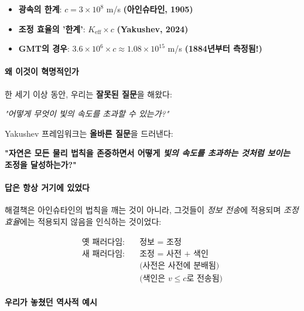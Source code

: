 \documentclass[11pt,a4paper]{article}
\begin{document}
\begin{itemize}
\item \textbf{광속의 한계}: $c = 3 \times 10^8$ m/s \textbf{(아인슈타인, 1905)}
\item \textbf{조정 효율의 '한계'}: $K_{\mathrm{eff}} \times c$ \textbf{(Yakushev, 2024)}
\item \textbf{GMT의 경우}: $3.6 \times 10^6 \times c \approx 1.08 \times 10^{15}$ m/s \textbf{(1884년부터 측정됨!)}
\end{itemize}

\paragraph{왜 이것이 혁명적인가}
한 세기 이상 동안, 우리는 \textbf{잘못된 질문}을 해왔다:
\begin{center}
\itshape "어떻게 무엇이 빛의 속도를 초과할 수 있는가?" 
\end{center}

Yakushev 프레임워크는 \textbf{올바른 질문}을 드러낸다:
\begin{center}
\bfseries "자연은 모든 물리 법칙을 존중하면서 어떻게 \emph{빛의 속도를 초과하는 것처럼 보이는} 조정을 달성하는가?"
\end{center}

\paragraph{답은 항상 거기에 있었다}
해결책은 아인슈타인의 법칙을 깨는 것이 아니라, 그것들이 \emph{정보 전송}에 적용되며 \emph{조정 효율}에는 적용되지 않음을 인식하는 것이었다:

\begin{align*}
\textbf{옛 패러다임:} & \quad \text{정보 = 조정} \\
\textbf{새 패러다임:} & \quad \text{조정 = 사전 + 색인} \\
& \quad \text{(사전은 사전에 분배됨)} \\
& \quad \text{(색인은 $v \leq c$로 전송됨)}
\end{align*}

\paragraph{우리가 놓쳤던 역사적 예시}
\end{document}
